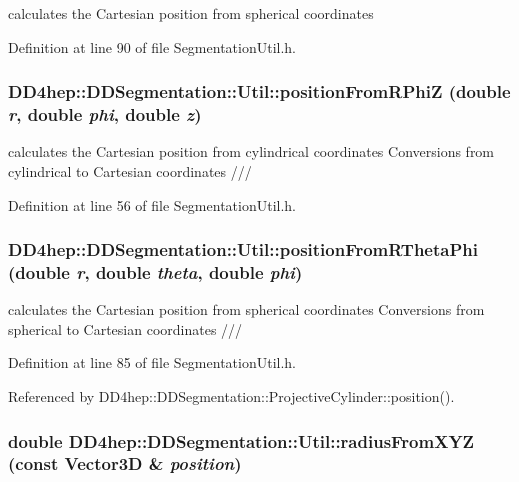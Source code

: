 calculates the Cartesian position from spherical coordinates 

Definition at line 90 of file SegmentationUtil.h.\hypertarget{namespace_d_d4hep_1_1_d_d_segmentation_1_1_util_a26afeef0487b44d0d1c634f43e1de11a}{
\subsubsection[{positionFromRPhiZ}]{ DD4hep::DDSegmentation::Util::positionFromRPhiZ (double {\em r}, \/  double {\em phi}, \/  double {\em z})}}
\label{namespace_d_d4hep_1_1_d_d_segmentation_1_1_util_a26afeef0487b44d0d1c634f43e1de11a}


calculates the Cartesian position from cylindrical coordinates Conversions from cylindrical to Cartesian coordinates /// 

Definition at line 56 of file SegmentationUtil.h.\hypertarget{namespace_d_d4hep_1_1_d_d_segmentation_1_1_util_a9da66f5c45a3396609860916f296ae0c}{
\subsubsection[{positionFromRThetaPhi}]{ DD4hep::DDSegmentation::Util::positionFromRThetaPhi (double {\em r}, \/  double {\em theta}, \/  double {\em phi})}}
\label{namespace_d_d4hep_1_1_d_d_segmentation_1_1_util_a9da66f5c45a3396609860916f296ae0c}


calculates the Cartesian position from spherical coordinates Conversions from spherical to Cartesian coordinates /// 

Definition at line 85 of file SegmentationUtil.h.

Referenced by DD4hep::DDSegmentation::ProjectiveCylinder::position().\hypertarget{namespace_d_d4hep_1_1_d_d_segmentation_1_1_util_a27d8eaa8e3001150da1b4cf657eecbb0}{
\subsubsection[{radiusFromXYZ}]{\setlength{\rightskip}{0pt plus 5cm}double DD4hep::DDSegmentation::Util::radiusFromXYZ (const Vector3D \& {\em position})}}
\label{namespace_d_d4hep_1_1_d_d_segmentation_1_1_util_a27d8eaa8e3001150da1b4cf657eecbb0}


